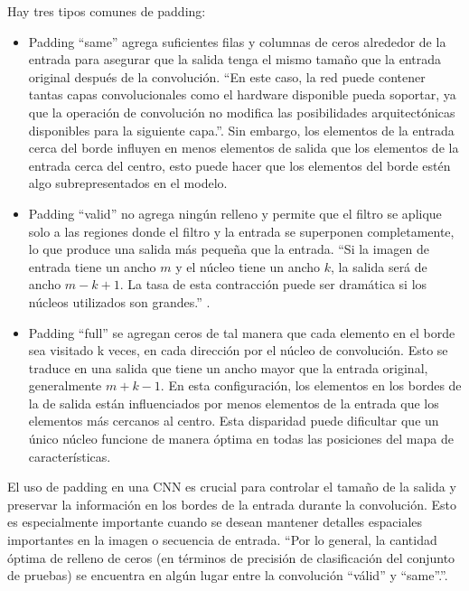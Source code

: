 Hay tres tipos comunes de padding: 

\begin{itemize}

	\item Padding ``same'' agrega suficientes filas y columnas de ceros alrededor de la entrada para asegurar que la salida tenga el mismo tamaño que la entrada original después de la convolución. ``En este caso, la red puede contener tantas capas convolucionales como el hardware disponible pueda soportar, ya que la operación de convolución no modifica las posibilidades arquitectónicas disponibles para la siguiente capa.''\cite[p. 350]{goodfellow2016deep}. Sin embargo, los elementos de la entrada cerca del borde influyen en menos elementos de salida que los elementos de la entrada cerca del centro, esto puede hacer que los elementos del borde estén algo subrepresentados en el modelo.
	
	\item Padding ``valid'' no agrega ningún relleno y permite que el filtro se aplique solo a las regiones donde el filtro y la entrada se superponen completamente, lo que produce una salida más pequeña que la entrada. ``Si la imagen de entrada tiene un ancho $m$ y el núcleo tiene un ancho $k$, la salida será de ancho $m - k + 1$. La tasa de esta contracción puede ser dramática si los núcleos utilizados son grandes.'' \cite[p. 350]{goodfellow2016deep}.
	
	\item Padding ``full'' se agregan ceros de tal manera que cada elemento en el borde sea visitado k veces, en cada dirección por el núcleo de convolución. Esto se traduce en una  salida que tiene un ancho mayor  que la entrada original, generalmente $m + k - 1$. En esta configuración, los elementos en los bordes de la  de salida están influenciados por menos elementos de la  entrada que los elementos más cercanos al centro. Esta disparidad puede dificultar que un único núcleo funcione de manera óptima en todas las posiciones del mapa de características.
	
\end{itemize}

El uso de padding en una CNN es crucial para controlar el tamaño de la salida y preservar la información en los bordes de la entrada durante la convolución. Esto es especialmente importante cuando se desean mantener detalles espaciales importantes en la imagen o secuencia de entrada. ``Por lo general, la cantidad óptima de relleno de ceros (en términos de precisión de clasificación del conjunto de pruebas) se encuentra en algún lugar entre la convolución ``válid'' y  ``same''.''\cite[p.350]{goodfellow2016deep}.

